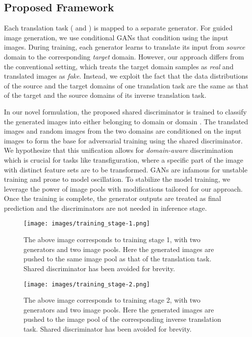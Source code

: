 \documentclass[a4paper,twoside]{article}
\begin{document}
\subsection{Proposed Framework}
\label{Proposed Framework}
\noindent
Each translation task ( and ) is mapped to a separate generator. For guided image generation, we use conditional GANs \cite{cGAN_MirzaO14} that condition using the input images. During training, each generator learns to translate its input from \textit{source} domain to the corresponding \textit{target} domain. However, our approach differs from the conventional setting, which treats the target domain samples as \textit{real} and translated images as \textit{fake}. Instead, we exploit the fact that the data distributions of the source and the target domains of one translation task are the same as that of the target and the source domains of its inverse translation task.

In our novel formulation, the proposed shared discriminator  is trained to classify the generated images into either belonging to domain  or domain . The translated images and random images from the two domains are conditioned on the input images to form the base for adversarial training using the shared discriminator. We hypothesize that this unification allows for \textit{domain-aware} discrimination which is crucial for tasks like transfiguration, where a specific part of the image with distinct feature sets are to be transformed. GANs are infamous for unstable training and prone to model oscillation. To stabilize the model training, we leverage the power of image pools with modifications tailored for our approach. Once the training is complete, the generator outputs are treated as final prediction and the discriminators are not needed in inference stage. 
\begin{figure}[t] \small
\centering
\texttt{[image: images/training\_stage-1.png]}
\caption{The above image corresponds to training stage 1, with two generators and two image pools. Here the generated images are pushed to the same image pool as that of the translation task. Shared discriminator has been avoided for brevity.} 
\label{fig:Training Stage 1}
\centering
\texttt{[image: images/training\_stage-2.png]}
\caption{The above image corresponds to training stage 2, with two generators and two image pools. Here the generated images are pushed to the image pool of the corresponding inverse translation task. Shared discriminator has been avoided for brevity.}
\label{fig:Training Stage 2}
\end{figure}
\end{document}
